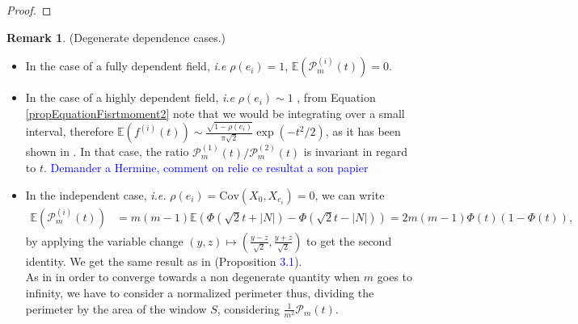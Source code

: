 \documentclass[12pt]{article}
\theoremstyle{Theorem}
\theoremstyle{definition}
\newtheorem{remark}{Remark}
\begin{document}
\begin{proof}
\end{proof}
\begin{remark}(Degenerate dependence cases.)
\label{casdegenerer}
\begin{itemize}
\item In the case of a fully dependent field, \textit{i.e}  $\rho(e_i) = 1$, $\mathbb{E}\left(\mathcal{P}_{m}^{\scriptscriptstyle (i)}(t) \right) = 0$.
\item In the case of a highly dependent field, \textit{i.e} $\rho(e_i) \sim 1$ ,  from Equation \eqref{propEquationFisrtmoment2} note that we would be integrating over a small interval, therefore $\mathbb{E}\left(f^{(i)}(t) \right) \sim \frac{\sqrt{1-\rho(e_i)}}{\pi\sqrt{2}} \exp(-t^2/2)$, as it has been shown in \cite{HermineAgnes}. In that case, the ratio $\mathcal{P}^{\scriptscriptstyle (1)}_{m}(t)/\mathcal{P}^{\scriptscriptstyle (2)}_{m}(t)$ is invariant in regard to $t$. \textcolor{blue}{Demander a Hermine, comment on relie ce resultat a son papier}
\item In the independent case, \textit{i.e.} $\rho(e_{i}) = \text{Cov}\left(X_{0}, X_{e_i}\right) = 0$, we can write
{\small
\begin{align*}
\mathbb{E}\left(\mathcal{P}^{\scriptscriptstyle  (i)}_{m}(t) \right) & = m(m-1)\mathbb{E}\left(\Phi\left(\sqrt{2}t + |N|\right) - \Phi\left(\sqrt{2}t - |N|\right)\right) = 2m(m-1)\Phi(t)\left(1-\Phi(t)\right), 
\end{align*}}by applying the variable change $ (y, z) \mapsto (\frac{y-z}{\sqrt{2}}, \frac{y+z}{\sqrt{2}})$ to get the second identity. We get the same result as in \cite{Psymetrie} (Proposition \textcolor{blue}{3.1}). \\ As in \cite{Psymetrie} in order to converge towards a non degenerate quantity when $m$ goes to infinity, we have to consider a normalized perimeter thus, dividing the perimeter by the area of the window $S$, considering $\frac{1}{m^2}\mathcal{P}_{m}(t)$.
\end{itemize}
\end{remark}
\end{document}

